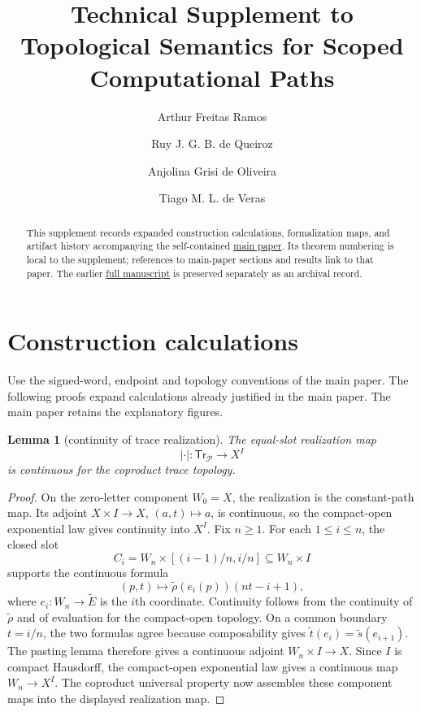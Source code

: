 \documentclass[10pt,reqno]{amsart}
\title[Topological Semantics for Scoped Computational Paths]
  {Technical Supplement to Topological Semantics for Scoped Computational Paths}
\author{Arthur Freitas Ramos}
\author{Ruy J. G. B. de Queiroz}
\author{Anjolina Grisi de Oliveira}
\author{Tiago M. L. de Veras}
\theoremstyle{definition}
\theoremstyle{plain}
\newtheorem{lemma}[definition]{Lemma}
\theoremstyle{remark}
\begin{document}
\raggedbottom

\renewcommand{\thesection}{S\arabic{section}}
\begin{abstract}
This supplement records expanded construction calculations, formalization
maps, and artifact history accompanying the self-contained
\href{main-reviewed.pdf}{main paper}. Its theorem numbering is local to the
supplement; references to main-paper sections and results link to that paper.
The earlier \href{geometric-rose-all-loops.pdf}{full manuscript} is preserved
separately as an archival record.
\end{abstract}
\maketitle

\section{Construction calculations}
Use the signed-word, endpoint and topology conventions of the main paper.
The following proofs expand calculations already justified in the main paper.
The main paper retains the explanatory figures.

\begin{lemma}[continuity of trace realization]
\label{lem:trace-realization-continuous}
The equal-slot realization map
\[
  |\cdot|:\mathsf{Tr}_{\mathcal P}\longrightarrow X^I
\]
is continuous for the coproduct trace topology.
\end{lemma}

\begin{proof}
On the zero-letter component $W_0=X$, the realization is the constant-path
map.  Its adjoint $X\times I\to X$, $(a,t)\mapsto a$, is continuous, so the
compact-open exponential law gives continuity into $X^I$.  Fix $n\geq1$.
For each $1\leq i\leq n$, the closed slot
\[
  C_i=W_n\times[(i-1)/n,i/n]\subseteq W_n\times I
\]
supports the continuous formula
\[
  (p,t)\longmapsto
  \widetilde\rho(e_i(p))(nt-i+1),
\]
where $e_i:W_n\to\widetilde E$ is the $i$th coordinate.  Continuity follows
from the continuity of $\widetilde\rho$ and of evaluation for the compact-open
topology.  On a
common boundary $t=i/n$, the two formulas agree because composability gives
\(\widetilde t(e_i)=\widetilde s(e_{i+1})\).  The pasting lemma therefore gives a continuous adjoint
\(W_n\times I\to X\).  Since $I$ is compact Hausdorff, the compact-open
exponential law gives a continuous map $W_n\to X^I$.  The coproduct
universal property now assembles these component maps into the displayed
realization map.
\end{proof}
\end{document}
